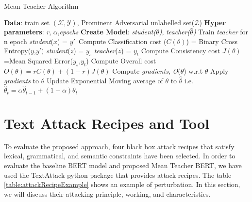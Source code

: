 \documentclass[%
	BCOR=8mm, %
	DIV=12,
	toc=bibliography, %
	toc=listof, %
	oneside, %
	egregdoesnotlikesansseriftitles, %
	]{scrbook}
\begin{document}
\begin{algorithm}[H]
    \caption{Mean Teacher Algorithm} \label{alg:MeanTeacher}
    \begin{algorithmic}
        \STATE \textbf{Data}: train set $\mathcal{(X,Y)}$,  Prominent Adversarial unlabelled set($\mathcal{Z}$)
        \STATE \textbf{Hyper parameters}: \emph{r}, \emph{$\alpha$},\emph{epochs}
        \STATE \textbf{Create Model}: \emph{student($\theta$)}, \emph{teacher($\hat\theta$)} 
        \STATE  Train \emph{teacher} for n epoch
        \STATE  \emph{student}($x$) = $y'$\
        \STATE Compute Classification cost ($C(\theta)$) = Binary Cross Entropy($y$,$y')$
        \STATE  \emph{student}($z$) = $y_s$
        \STATE  \emph{teacher}($z$) = $y_t$
        \STATE Compute Consistency cost $J(\theta)$=Mean Squared Error($y_s$,$y_{t}$)
        \STATE Compute Overall cost  $\textit{O}(\theta)= r C(\theta)+(1-r)J(\theta)$
        \STATE Compute \emph{gradients}, \textit{O}($\theta$) w.r.t  $\theta$ 
        \STATE Apply \emph{gradients} to $\theta$
        \STATE Update Exponential Moving average of $\theta$ to $\hat\theta$ i.e. $\hat\theta_t= \alpha\hat\theta_{t-1}+(1-\alpha)\theta_t$\
        \ENDWHILE
        \ENDFOR
    \end{algorithmic}
\end{algorithm}

\section{Text Attack Recipes and Tool}
\label{section:attackrecipes}
To evaluate the proposed approach, four black box attack recipes that satisfy lexical, grammatical, and semantic constraints have been selected. In order to evaluate the baseline BERT model and proposed Mean Teacher BERT, we have used the TextAttack python package\cite{morris_textattack_2020}  that provides attack recipes. The table \ref{table:attackRecipeExample} shows an example of perturbation. In this section, we will discuss their attacking principle, working, and characteristics.
\end{document}
